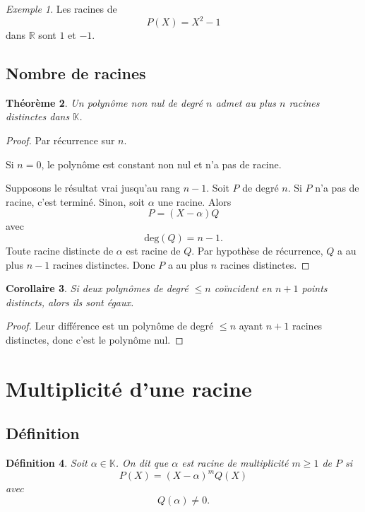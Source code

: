 \documentclass[11pt,a4paper]{article}
\newtheorem{definition}{Définition}[section]
\newtheorem{theoreme}[definition]{Théorème}
\newtheorem{corollaire}[definition]{Corollaire}
\theoremstyle{remark}
\newtheorem{exemple}[definition]{Exemple}
\newcommand{\R}{\mathbb{R}}
\newcommand{\K}{\mathbb{K}}
\newcommand{\degP}{\mathrm{deg}}
\begin{document}
\begin{exemple}
Les racines de
\[
P(X)=X^2-1
\]
dans \(\R\) sont \(1\) et \(-1\).
\end{exemple}

\subsection{Nombre de racines}

\begin{theoreme}
Un polynôme non nul de degré \(n\) admet au plus \(n\) racines distinctes dans \(\K\).
\end{theoreme}

\begin{proof}
Par récurrence sur \(n\).

Si \(n=0\), le polynôme est constant non nul et n’a pas de racine.

Supposons le résultat vrai jusqu’au rang \(n-1\). Soit \(P\) de degré \(n\). Si \(P\) n’a pas de racine, c’est terminé. Sinon, soit \(\alpha\) une racine. Alors
\[
P=(X-\alpha)Q
\]
avec
\[
\degP(Q)=n-1.
\]
Toute racine distincte de \(\alpha\) est racine de \(Q\). Par hypothèse de récurrence, \(Q\) a au plus \(n-1\) racines distinctes. Donc \(P\) a au plus \(n\) racines distinctes.
\end{proof}

\begin{corollaire}
Si deux polynômes de degré \(\le n\) coïncident en \(n+1\) points distincts, alors ils sont égaux.
\end{corollaire}

\begin{proof}
Leur différence est un polynôme de degré \(\le n\) ayant \(n+1\) racines distinctes, donc c’est le polynôme nul.
\end{proof}

\section{Multiplicité d’une racine}

\subsection{Définition}

\begin{definition}
Soit \(\alpha\in\K\). On dit que \(\alpha\) est racine de multiplicité \(m\ge 1\) de \(P\) si
\[
P(X)=(X-\alpha)^mQ(X)
\]
avec
\[
Q(\alpha)\neq 0.
\]
\end{definition}
\end{document}
